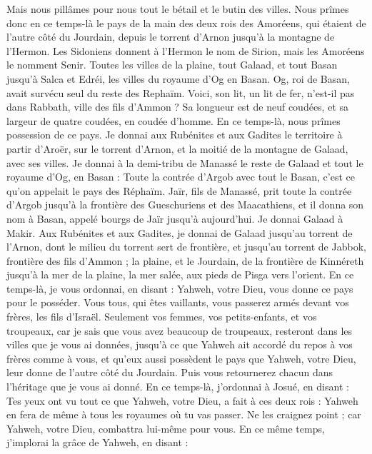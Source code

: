 \begin{multicols}{2}
Mais nous pillâmes pour nous tout le bétail et le butin des villes.
Nous prîmes donc en ce temps-là le pays de la main des deux rois des Amoréens, qui étaient de l’autre côté du Jourdain, depuis le torrent d'Arnon jusqu'à la montagne de l'Hermon.
Les Sidoniens donnent à l’Hermon le nom de Sirion, mais les Amoréens le nomment Senir.
Toutes les villes de la plaine, tout Galaad, et tout Basan jusqu'à Salca et Edréi, les villes du royaume d’Og en Basan.
Og, roi de Basan, avait survécu seul du reste des Rephaïm. Voici, son lit, un lit de fer, n'est-il pas dans Rabbath, ville des fils d’Ammon ? Sa longueur est de neuf coudées, et sa largeur de quatre coudées, en coudée d'homme.
En ce temps-là, nous prîmes possession de ce pays. Je donnai aux Rubénites et aux Gadites le territoire à partir d’Aroër, sur le torrent d'Arnon, et la moitié de la montagne de Galaad, avec ses villes.
Je donnai à la demi-tribu de Manassé le reste de Galaad et tout le royaume d’Og, en Basan : Toute la contrée d'Argob avec tout le Basan, c’est ce qu’on appelait le pays des Réphaïm.
Jaïr, fils de Manassé, prit toute la contrée d'Argob jusqu'à la frontière des Gueschuriens et des Maacathiens, et il donna son nom à Basan, appelé bourgs de Jaïr jusqu'à aujourd'hui.
Je donnai Galaad à Makir.
Aux Rubénites et aux Gadites, je donnai de Galaad jusqu'au torrent de l'Arnon, dont le milieu du torrent sert de frontière, et jusqu'au torrent de Jabbok, frontière des fils d’Ammon ;
la plaine, et le Jourdain, de la frontière de Kinnéreth jusqu'à la mer de la plaine, la mer salée, aux pieds de Pisga vers l'orient.
En ce temps-là, je vous ordonnai, en disant : Yahweh, votre Dieu, vous donne ce pays pour le posséder. Vous tous, qui êtes vaillants, vous passerez armés devant vos frères, les fils d'Israël.
Seulement vos femmes, vos petits-enfants, et vos troupeaux, car je sais que vous avez beaucoup de troupeaux, resteront dans les villes que je vous ai données,
jusqu'à ce que Yahweh ait accordé du repos à vos frères comme à vous, et qu'eux aussi possèdent le pays que Yahweh, votre Dieu, leur donne de l’autre côté du Jourdain. Puis vous retournerez chacun dans l’héritage que je vous ai donné.
En ce temps-là, j’ordonnai à Josué, en disant : Tes yeux ont vu tout ce que Yahweh, votre Dieu, a fait à ces deux rois : Yahweh en fera de même à tous les royaumes où tu vas passer.
Ne les craignez point ; car Yahweh, votre Dieu, combattra lui-même pour vous.
En ce même temps, j’implorai la grâce de Yahweh, en disant :

\end{multicols}
